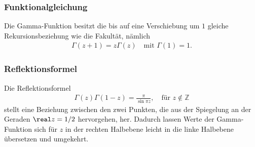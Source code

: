 \subsubsection{Funktionalgleichung}
Die Gamma-Funktion besitzt die bis auf eine Verschiebung um $1$ gleiche
Rekursionsbeziehung wie die Fakultät,
%
nämlich
\begin{align}
\Gamma(z+1)
=
z \Gamma(z)
\quad
\text{mit }
\Gamma(1)
=
1
.
\label{laguerre:gamma_funktional}
\end{align}

\subsubsection{Reflektionsformel}
Die Reflektionsformel
%
\begin{align}
\Gamma(z) \Gamma(1 - z)
=
\frac{\pi}{\sin \pi z}
,\quad
\text{für }
z \notin \mathbb{Z}
\label{laguerre:gamma_refform}
\end{align}
stellt eine Beziehung zwischen den zwei Punkten,
die aus der Spiegelung an der Geraden $\real z = 1/2$ hervorgehen,
her.
Dadurch lassen Werte der Gamma-Funktion sich für $z$ in der rechten Halbebene
leicht in die linke Halbebene übersetzen und umgekehrt.

